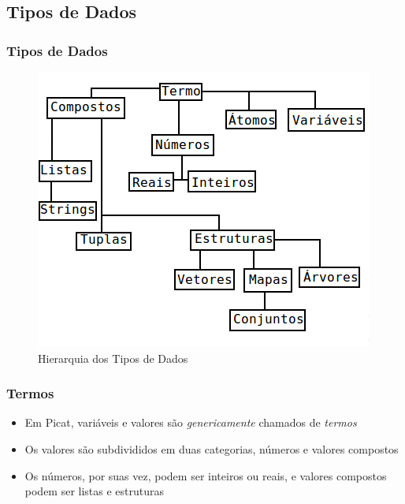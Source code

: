 
\subsection{Tipos de Dados}


\begin{frame}
	\frametitle{Tipos de Dados}
	

	\begin{figure}[!ht]
		\centering
		\includegraphics[width = .725\linewidth]{figures/tipos_dados_picat__traduzido3.png}
		\caption{Hierarquia dos Tipos de Dados}
		\label{fig:TiposDados}
	\end{figure}
\end{frame}


\begin{frame}
	\frametitle{Termos}

\begin{itemize}
	  \item Em Picat, variáveis e valores são \textit{genericamente} chamados de \textit{termos}
	
	  \pause 
	  \item Os valores são subdivididos em duas categorias, números e valores 
	compostos
	
		  \item Os números, por suas vez, podem ser inteiros ou reais, e valores compostos
	podem ser listas e estruturas
	
	
	\end{itemize}	
\end{frame}

